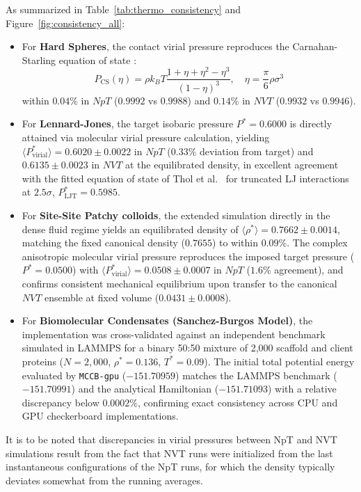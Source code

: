 \documentclass[final,5p,times,twocolumn]{elsarticle}
\begin{document}
As summarized in Table~\ref{tab:thermo_consistency} and
Figure~\ref{fig:consistency_all}: 
\begin{itemize}
    \item For {\bf Hard Spheres}, the contact virial pressure reproduces the Carnahan-Starling equation of state \cite{carnahan1969equation}:
    \begin{equation}
        P_{\text{CS}}(\eta) = \rho k_B T \frac{1 + \eta + \eta^2 - \eta^3}{(1 - \eta)^3}, \quad \eta = \frac{\pi}{6}\rho\sigma^3
    \end{equation}
    within $\mathbf{0.04\%}$ in $NpT$ ($0.9992$ vs $0.9988$) and $\mathbf{0.14\%}$ in $NVT$ ($0.9932$ vs $0.9946$).
    \item For {\bf Lennard-Jones}, the target isobaric pressure $P^* =
      0.6000$ is directly attained via molecular virial pressure
      calculation, yielding $\langle P^*_{\text{virial}} \rangle =
      0.6020 \pm 0.0022$ in $NpT$ ($0.33\%$ deviation from target) and
      $0.6135 \pm 0.0023$ in $NVT$ at the equilibrated density, in
      excellent agreement with the fitted equation of state of Thol et
      al.~\cite{Thol2014} for truncated LJ interactions at
      $2.5\sigma$, $P^*_{\text{LJT}}=0.5985$. 
    \item For {\bf Site-Site Patchy colloids}, the extended simulation
      directly in the dense fluid regime yields an equilibrated
      density of $\langle \rho^* \rangle = 0.7662 \pm 0.0014$,
      matching the fixed canonical density ($0.7655$) to within
      $\mathbf{0.09\%}$. The complex anisotropic molecular virial
      pressure reproduces the imposed target pressure ($P^*=0.0500$)
      with $\langle P^*_{\text{virial}} \rangle = 0.0508 \pm 0.0007$
      in $NpT$ ($1.6\%$ agreement), and confirms consistent mechanical
      equilibrium upon transfer to the canonical $NVT$ ensemble at
      fixed volume ($0.0431 \pm 0.0008$). 
    \item For {\bf Biomolecular Condensates (Sanchez-Burgos Model)},
      the implementation was cross-validated against an independent
      benchmark simulated in LAMMPS \cite{thompson2022lammps} for a
      binary 50:50 mixture of 2,000 scaffold and client proteins ($N =
      2{,}000$, $\rho^* = 0.136$, $T^* = 0.09$). The initial total
      potential energy evaluated by \texttt{MCCB-gpu} ($-151.70959$)
      matches the LAMMPS benchmark ($-151.70991$) and the analytical
      Hamiltonian ($-151.71093$) with a relative discrepancy below
      $0.0002\%$, confirming exact consistency across CPU and GPU
      checkerboard implementations. 
\end{itemize} 
It is to be noted that discrepancies in virial pressures between NpT
and NVT simulations result from the fact that NVT runs were
initialized from the last instantaneous configurations of the NpT
runs, for which the density typically deviates somewhat from the
running averages. 
\end{document}
